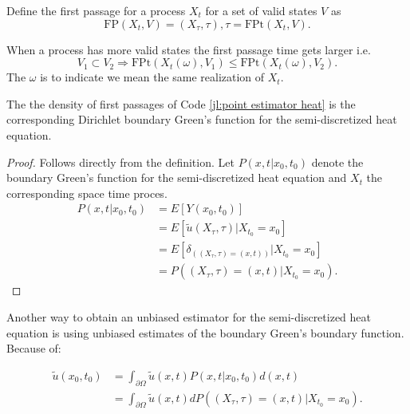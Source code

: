 \documentclass[a4paper,12pt]{article}
\begin{document}
\begin{definition} \label{def:first passage}
  Define the first passage for a process $X_{t}$ for a set of valid states
  $V$ as
  \begin{equation}
    \text{FP}(X_{t},V)=(X_{\tau},\tau), \tau = \text{FPt}(X_{t},V)
    .
  \end{equation}
\end{definition}

\begin{lemma} \label{lem: FP order}
  When a process has more valid states the first passage time gets larger i.e.
  \begin{equation}
    V_{1} \subset V_{2} \Rightarrow
    \text{FPt}(X_{t}(\omega),V_{1}) \le  \text{FPt}(X_{t}(\omega),V_{2}) .
  \end{equation}
  The $\omega$ is to indicate we mean the same realization of $X_{t}$.
\end{lemma}

\begin{theorem}
  The the density of first passages of Code \ref{jl:point estimator heat} is  the
  corresponding Dirichlet boundary Green's function for the semi-discretized heat equation.
\end{theorem}

\begin{proof}
  Follows directly from the definition.
  Let $P(x,t|x_{0},t_{0})$ denote the boundary Green's
  function for the semi-discretized heat equation and $X_{t}$
  the corresponding space time proces.
  \begin{align}
    P(x,t|x_{0},t_{0}) & = E[Y(x_0,t_0)]                                         \\
                       & = E[\tilde{u}(X_{\tau},\tau) | X_{t_0} = x_0 ]          \\
                       & = E[\delta_{((X_{\tau},\tau) = (x,t))}| X_{t_0} = x_0 ] \\
                       & = P((X_{\tau},\tau) = (x,t)| X_{t_0} = x_0 )
    .
  \end{align}
\end{proof}


Another way to obtain an unbiased estimator for the semi-discretized heat equation is using unbiased estimates
of the boundary Green's boundary function. Because of:

\begin{align}
  \tilde{u}(x_{0},t_{0}) & = \int_{\partial \Omega} \tilde{u}(x,t) P(x,t|x_{0},t_{0}) d(x,t)                    \\
                         & = \int_{\partial \Omega} \tilde{u}(x,t)  dP((X_{\tau},\tau) = (x,t)| X_{t_0} = x_0 )
  .
\end{align}
\end{document}

